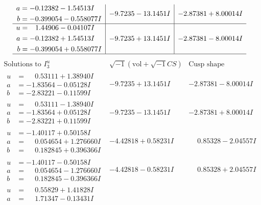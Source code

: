 \documentclass[1p]{elsarticle_modified}
\theoremstyle{definition}
\newcommand{\I}{\sqrt{-1}}
\begin{document}
$$\begin{array}{c|c|c}
\begin{aligned}
a &= -0.12382 - 1.54513 I \\
b &= -0.399054 - 0.558077 I\end{aligned}
 & -9.7235 - 13.1451 I & -2.87381 + 8.00014 I \\ \hline\begin{aligned}
u &= \phantom{-}1.44906 - 0.04107 I \\
a &= -0.12382 + 1.54513 I \\
b &= -0.399054 + 0.558077 I\end{aligned}
 & -9.7235 + 13.1451 I & -2.87381 - 8.00014 I\\
 \hline 
 \end{array}$$\newpage$$\begin{array}{c|c|c}  
\text{Solutions to }I^u_{3}& \I (\text{vol} + \sqrt{-1}CS) & \text{Cusp shape}\\
 \hline 
\begin{aligned}
u &= \phantom{-}0.53111 + 1.38940 I \\
a &= -1.83564 - 0.05128 I \\
b &= -2.83221 - 0.11599 I\end{aligned}
 & -9.7235 + 13.1451 I & -2.87381 - 8.00014 I \\ \hline\begin{aligned}
u &= \phantom{-}0.53111 - 1.38940 I \\
a &= -1.83564 + 0.05128 I \\
b &= -2.83221 + 0.11599 I\end{aligned}
 & -9.7235 - 13.1451 I & -2.87381 + 8.00014 I \\ \hline\begin{aligned}
u &= -1.40117 + 0.50158 I \\
a &= \phantom{-}0.054654 + 1.276660 I \\
b &= \phantom{-}0.182845 + 0.396366 I\end{aligned}
 & -4.42818 + 0.58231 I & \phantom{-}0.85328 - 2.04557 I \\ \hline\begin{aligned}
u &= -1.40117 - 0.50158 I \\
a &= \phantom{-}0.054654 - 1.276660 I \\
b &= \phantom{-}0.182845 - 0.396366 I\end{aligned}
 & -4.42818 - 0.58231 I & \phantom{-}0.85328 + 2.04557 I \\ \hline\begin{aligned}
u &= \phantom{-}0.55829 + 1.41828 I \\
a &= \phantom{-}1.71347 - 0.13431 I \\

\end{aligned}
\end{array}$$
\end{document}
